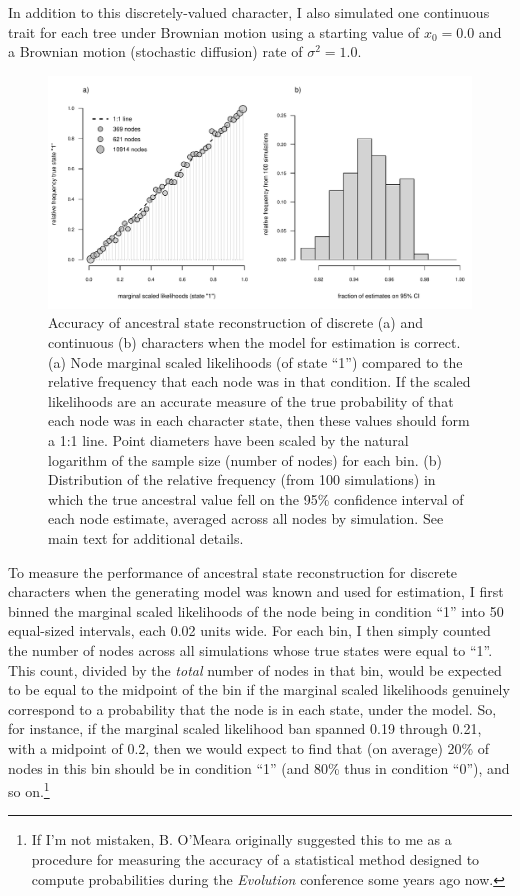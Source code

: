 \documentclass{article}
\begin{document}
In addition to this discretely-valued character, I also simulated one continuous trait for each tree under Brownian motion using a starting value of \(x_0 = 0.0\) and a Brownian motion (stochastic diffusion) rate of \(\sigma^2 = 1.0\).

\begin{figure}
\includegraphics[width=1\linewidth]{Revell.AncestralReconstruction_files/figure-latex/fig13-1} \caption{Accuracy of ancestral state reconstruction of discrete (a) and continuous (b) characters when the model for estimation is correct. (a) Node marginal scaled likelihoods (of state ``1'') compared to the relative frequency that each node was in that condition. If the scaled likelihoods are an accurate measure of the true probability of that each node was in each character state, then these values should form a 1:1 line. Point diameters have been scaled by the natural logarithm of the sample size (number of nodes) for each bin. (b) Distribution of the relative frequency (from 100 simulations) in which the true ancestral value fell on the 95\% confidence interval of each node estimate, averaged across all nodes by simulation. See main text for additional details.}\label{fig:fig13}
\end{figure}

To measure the performance of ancestral state reconstruction for discrete characters when the generating model was known and used for estimation, I first binned the marginal scaled likelihoods of the node being in condition ``1'' into 50 equal-sized intervals, each 0.02 units wide. For each bin, I then simply counted the number of nodes across all simulations whose true states were equal to ``1''. This count, divided by the \emph{total} number of nodes in that bin, would be expected to be equal to the midpoint of the bin if the marginal scaled likelihoods genuinely correspond to a probability that the node is in each state, under the model. So, for instance, if the marginal scaled likelihood ban spanned 0.19 through 0.21, with a midpoint of 0.2, then we would expect to find that (on average) 20\% of nodes in this bin should be in condition ``1'' (and 80\% thus in condition ``0''), and so on.\footnote{If I'm not mistaken, B. O'Meara originally suggested this to me as a procedure for measuring the accuracy of a statistical method designed to compute probabilities during the \emph{Evolution} conference some years ago now.}
\end{document}
